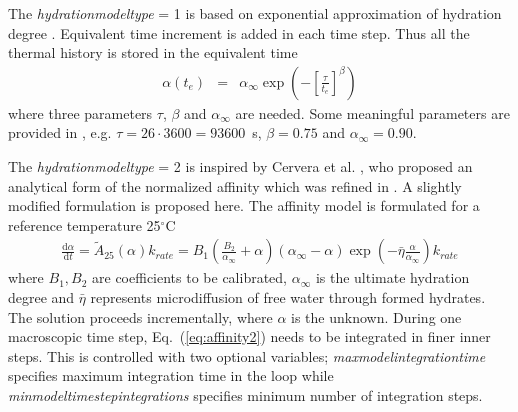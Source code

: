 \documentclass[a4paper]{article}
\newcommand{\param}[1]{{\it #1}}
\newcommand{\ud}{\mathrm{d}}
\newcommand{\refeq}[1]{Eq.~(\ref{#1})}
\newcommand{\C}{$^{\circ}\mathrm{C}$}
\begin{document}
The \param{hydrationmodeltype} = 1 is based on exponential approximation of hydration degree \cite{Schindler:2005}. Equivalent time increment is added in each time step. Thus all the thermal history is stored in the equivalent time
\begin{eqnarray}
\alpha(t_e) &=& \alpha_\infty \exp\left(-\left[\frac{\tau}{t_e} \right]^\beta \right)\label{eq:affinity1}
\end{eqnarray}
where three parameters $\tau$, $\beta$ and $\alpha_\infty$ are needed. Some meaningful parameters are provided in \cite{Schindler:2005}, e.g. $\tau=26\cdot3600=93600$~s, $\beta=0.75$ and $\alpha_\infty=0.90$.

The \param{hydrationmodeltype} = 2 is inspired by Cervera et al. \cite{Cervera:99}, who proposed an analytical form of the normalized affinity which was refined in \cite{Gawin:06a}. A slightly modified formulation is proposed here. The affinity model is formulated for a reference temperature 25\C
\begin{eqnarray}
\frac{\ud \alpha}{\ud t} = \tilde{A}_{25}(\alpha) k_{rate}= B_1 \left( \frac{B_2}{\alpha_\infty} + \alpha \right ) \left( \alpha_\infty - \alpha \right) \exp\left(-\bar\eta\frac{\alpha}{\alpha_\infty}\right) k_{rate} \label{eq:affinity2}
\end{eqnarray}
where $B_1, B_2$ are coefficients to be calibrated, $\alpha_\infty$ is the ultimate hydration degree and $\bar\eta$ represents microdiffusion of free water through formed hydrates. The solution proceeds incrementally, where $\alpha$ is the unknown. During one macroscopic time step, \refeq{eq:affinity2} needs to be integrated in finer inner steps. This is controlled with two optional variables; \param{maxmodelintegrationtime} specifies maximum integration time in the loop while \param{minmodeltimestepintegrations} specifies minimum number of integration steps.
\end{document}
